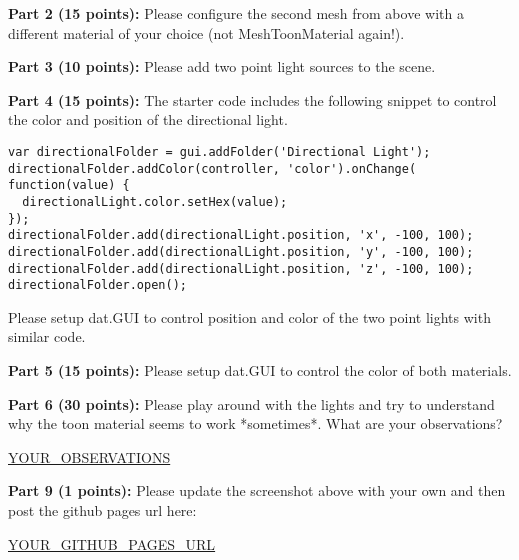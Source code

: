 \documentclass[10pt,oneside,onecolumn,letterpaper]{article}
\begin{document}
\vspace{.5cm}

\noindent\textbf{Part 2 (15 points):} Please configure the second mesh from above with a different material of your choice (not MeshToonMaterial again!).

\vspace{.5cm}

\noindent\textbf{Part 3 (10 points):} Please add two point light sources to the scene.

\vspace{.5cm}

\noindent\textbf{Part 4 (15 points):} The starter code includes the following snippet to control the color and position of the directional light.

\begin{verbatim}
var directionalFolder = gui.addFolder('Directional Light');
directionalFolder.addColor(controller, 'color').onChange( function(value) {
  directionalLight.color.setHex(value); 
});
directionalFolder.add(directionalLight.position, 'x', -100, 100);
directionalFolder.add(directionalLight.position, 'y', -100, 100);
directionalFolder.add(directionalLight.position, 'z', -100, 100);
directionalFolder.open();   
\end{verbatim}

Please setup dat.GUI to control position and color of the two point lights with similar code.

\vspace{.5cm}

\noindent\textbf{Part 5 (15 points):} Please setup dat.GUI to control the color of both materials.


\vspace{.5cm}
\noindent\textbf{Part 6 (30 points):} Please play around with the lights and try to understand why the toon material seems to work *sometimes*. What are your observations?

\vspace{.5cm}

\url{YOUR_OBSERVATIONS}

\vspace{3cm}

\noindent\textbf{Part 9 (1 points):} Please update the screenshot above with your own and then post the github pages url here:

\vspace{.5cm}

\url{YOUR_GITHUB_PAGES_URL}

\vspace{3cm}
\end{document}
